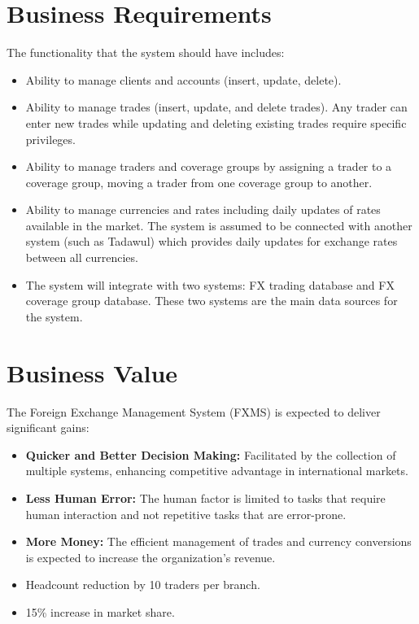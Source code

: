 \documentclass[a4paper]{report}
\begin{document}
\section{Business Requirements}
The functionality that the system should have includes:
\begin{itemize}
    \item Ability to manage clients and accounts (insert, update, delete).
    \item Ability to manage trades (insert, update, and delete trades). Any trader can enter new trades while updating and deleting existing trades require specific privileges.
    \item Ability to manage traders and coverage groups by assigning a trader to a coverage group, moving a trader from one coverage group to another.
    \item Ability to manage currencies and rates including daily updates of rates available in the market. The system is assumed to be connected with another system (such as Tadawul) which provides daily updates for exchange rates between all currencies.
    \item The system will integrate with two systems: FX trading database and FX coverage group database. These two systems are the main data sources for the system.
\end{itemize}

\section{Business Value}
The Foreign Exchange Management System (FXMS) is expected to deliver significant gains:
\begin{itemize}
    \item \textbf{Quicker and Better Decision Making:} Facilitated by the collection of multiple systems, enhancing competitive advantage in international markets.
    \item \textbf{Less Human Error:} The human factor is limited to tasks that require human interaction and not repetitive tasks that are error-prone.
    \item \textbf{More Money:} The efficient management of trades and currency conversions is expected to increase the organization's revenue.
    \item Headcount reduction by 10 traders per branch.
    \item 15\% increase in market share.
\end{itemize}
\end{document}
